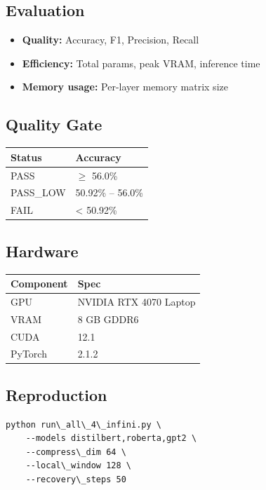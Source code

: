 \subsection{Evaluation}

\begin{itemize}
\item \textbf{Quality:} Accuracy, F1, Precision, Recall
\item \textbf{Efficiency:} Total params, peak VRAM, inference time
\item \textbf{Memory usage:} Per-layer memory matrix size

\end{itemize}
\subsection{Quality Gate}

\begin{table}[H]
\centering
\small
\begin{tabular}{ll}
\toprule
\textbf{Status} & \textbf{Accuracy} \\
\midrule
PASS & $\ge$ 56.0\% \\
PASS\_LOW & 50.92\% -- 56.0\% \\
FAIL & \textless{} 50.92\% \\
\bottomrule
\end{tabular}
\end{table}

\subsection{Hardware}

\begin{table}[H]
\centering
\small
\begin{tabular}{ll}
\toprule
\textbf{Component} & \textbf{Spec} \\
\midrule
GPU & NVIDIA RTX 4070 Laptop \\
VRAM & 8 GB GDDR6 \\
CUDA & 12.1 \\
PyTorch & 2.1.2 \\
\bottomrule
\end{tabular}
\end{table}

\subsection{Reproduction}

\begin{lstlisting}
python run\_all\_4\_infini.py \
    --models distilbert,roberta,gpt2 \
    --compress\_dim 64 \
    --local\_window 128 \
    --recovery\_steps 50
\end{lstlisting}


